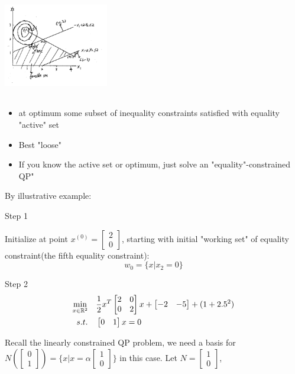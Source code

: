 \begin{marginfigure}
	\centering
	\includegraphics[width=1.8in,height=1.8in]{figures/ch07/figure1021_1.png}
\end{marginfigure}

\begin{itemize}
	\item at optimum some subset of inequality constraints satisfied with equality "active" set
	
	\item Best "loose"
	
	\item If you know the active set or optimum, just solve an "equality"-constrained QP"
\end{itemize}
By illustrative example:

Step 1

Initialize at point $x^{(0)} = \begin{bmatrix}
2\\
0
\end{bmatrix}$, starting with initial "working set" of equality constraint(the fifth equality constraint):
$$w_0 = \{x|x_2 = 0 \}$$


Step 2
 \begin{align*}
\min_{x\in \mathbb{R}^2} \quad
&
\frac{1}{2}x^T
\begin{bmatrix}
2&0\\
0&2
\end{bmatrix}
x + 
\begin{bmatrix}
-2 & -5
\end{bmatrix} 
+ (1 + 2.5^2)\\
s.t.\quad &
\begin{bmatrix}
0 & 1
\end{bmatrix}
x = 0
\end{align*}


Recall the linearly constrained QP problem, we need a basis for 
$N(\begin{bmatrix} 
0\\
1
\end{bmatrix}) 
= \{x|x = \alpha
\begin{bmatrix}
1\\
0
\end{bmatrix} \}$
in this case. Let
$N=
\begin{bmatrix}
1\\
0
\end{bmatrix}$,

